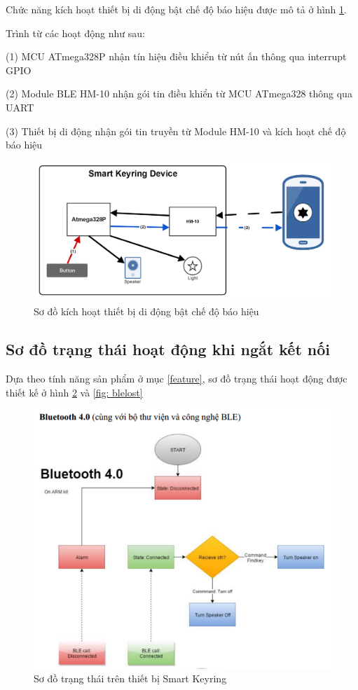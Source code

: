 Chức năng kích hoạt thiết bị di động bật chế độ báo hiệu được mô tả ở hình \ref{fig: ring2}.

Trình từ các hoạt động như sau:

(1) MCU ATmega328P nhận tín hiệu điều khiển từ nút ấn thông qua interrupt GPIO

(2) Module BLE HM-10 nhận gói tin điều khiển từ MCU ATmega328 thông qua UART

(3) Thiết bị di động nhận gói tin truyền từ Module HM-10 và kích hoạt chế độ báo hiệu

\begin{figure}[h]
	\centering    
	\includegraphics[width=1.0\textwidth]{ring2}
	\caption[Sơ đồ kích hoạt thiết bị di động bật chế độ báo hiệu]{Sơ đồ kích hoạt thiết bị di động bật chế độ báo hiệu}
	\label{fig: ring2}
\end{figure}
\newpage

\subsection{Sơ đồ trạng thái hoạt động khi ngắt kết nối}
Dựa theo tính năng sản phẩm ở mục \ref{feature}, sơ đồ trạng thái hoạt động được thiết kế ở hình \ref{fig: ble} và \ref{fig: blelost}

	\begin{figure}[h]
		\centering    
		\includegraphics[width=1.0\textwidth]{ble}
		\caption[Sơ đồ trạng thái trên thiết bị Smart Keyring]{Sơ đồ trạng thái trên thiết bị Smart Keyring}
		\label{fig: ble}
	\end{figure}
	
